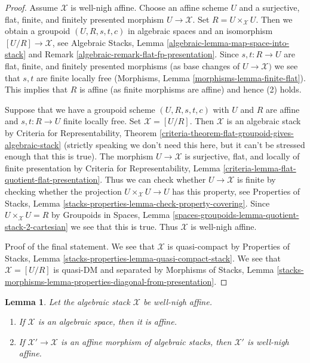 \documentclass{stacks-project}
\theoremstyle{plain}
\newtheorem{lemma}[subsection]{Lemma}
\theoremstyle{definition}
\theoremstyle{remark}
\numberwithin{equation}{subsection}
\begin{document}
\begin{proof}
Assume $\mathcal{X}$ is well-nigh affine. Choose an affine scheme $U$
and a surjective, flat, finite, and finitely presented morphism
$U \to \mathcal{X}$. Set $R = U \times_\mathcal{X} U$. Then we
obtain a groupoid $(U, R, s, t, c)$ in algebraic spaces and an
isomorphism $[U/R] \to \mathcal{X}$, see
Algebraic Stacks, Lemma \ref{algebraic-lemma-map-space-into-stack}
and Remark \ref{algebraic-remark-flat-fp-presentation}.
Since $s, t : R \to U$ are 
flat, finite, and finitely presented morphisms
(as base changes of $U \to \mathcal{X})$ we see that
$s, t$ are finite locally free
(Morphisms, Lemma \ref{morphisms-lemma-finite-flat}).
This implies that $R$ is affine (as finite morphisms are affine)
and hence (2) holds.

\medskip\noindent
Suppose that we have a groupoid scheme $(U, R, s, t, c)$ with $U$ and
$R$ are affine and $s, t : R \to U$ finite locally free.
Set $\mathcal{X} = [U/R]$. Then $\mathcal{X}$ is an algebraic stack
by Criteria for Representability, Theorem
\ref{criteria-theorem-flat-groupoid-gives-algebraic-stack} (strictly speaking
we don't need this here, but it can't be stressed enough that this is true).
The morphism $U \to \mathcal{X}$ is surjective, flat, and locally
of finite presentation by
Criteria for Representability, Lemma
\ref{criteria-lemma-flat-quotient-flat-presentation}.
Thus we can check whether $U \to \mathcal{X}$ is finite by
checking whether the projection $U \times_\mathcal{X} U \to U$
has this property, see Properties of Stacks, Lemma
\ref{stacks-properties-lemma-check-property-covering}.
Since $U \times_\mathcal{X} U = R$ by
Groupoids in Spaces, Lemma
\ref{spaces-groupoids-lemma-quotient-stack-2-cartesian}
we see that this is true. Thus $\mathcal{X}$ is well-nigh affine.

\medskip\noindent
Proof of the final statement. We see that $\mathcal{X}$
is quasi-compact by Properties of Stacks, Lemma
\ref{stacks-properties-lemma-quasi-compact-stack}.
We see that $\mathcal{X} = [U/R]$ is quasi-DM and separated by
Morphisms of Stacks, Lemma
\ref{stacks-morphisms-lemma-properties-diagonal-from-presentation}.
\end{proof}

\begin{lemma}
\label{lemma-affine-over-well-nigh-affine}
Let the algebraic stack $\mathcal{X}$ be well-nigh affine.
\begin{enumerate}
\item If $\mathcal{X}$ is an algebraic space, then it is affine.
\item If $\mathcal{X}' \to \mathcal{X}$ is an affine morphism
of algebraic stacks, then $\mathcal{X}'$ is well-nigh affine.
\end{enumerate}
\end{lemma}
\end{document}
